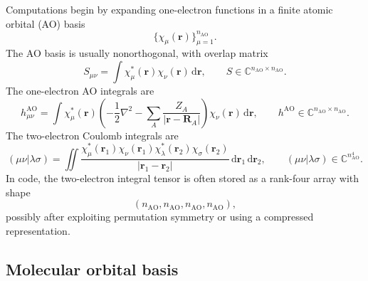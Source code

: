 \documentclass[11pt]{article}
\newcommand{\dd}{\,\mathrm{d}}
\begin{document}
Computations begin by expanding one-electron functions in a finite atomic orbital (AO) basis
\begin{equation}
    \{\chi_\mu(\mathbf{r})\}_{\mu=1}^{n_{\mathrm{AO}}}.
\end{equation}
The AO basis is usually nonorthogonal, with overlap matrix
\begin{equation}
    S_{\mu\nu}=\int \chi_\mu^*(\mathbf{r})\chi_\nu(\mathbf{r})\dd\mathbf{r},
    \qquad S\in\mathbb{C}^{n_{\mathrm{AO}}\times n_{\mathrm{AO}}}.
\end{equation}
The one-electron AO integrals are
\begin{equation}
    h^{\mathrm{AO}}_{\mu\nu}
    = \int \chi_\mu^*(\mathbf{r})
    \left(
        -\frac{1}{2}\nabla^2
        - \sum_A \frac{Z_A}{|\mathbf{r}-\mathbf{R}_A|}
    \right)
    \chi_\nu(\mathbf{r})\dd\mathbf{r},
    \qquad h^{\mathrm{AO}}\in\mathbb{C}^{n_{\mathrm{AO}}\times n_{\mathrm{AO}}}.
\end{equation}
The two-electron Coulomb integrals are
\begin{equation}
    (\mu\nu|\lambda\sigma)
    = \iint
    \frac{
        \chi_\mu^*(\mathbf{r}_1)\chi_\nu(\mathbf{r}_1)
        \chi_\lambda^*(\mathbf{r}_2)\chi_\sigma(\mathbf{r}_2)
    }
    {|\mathbf{r}_1-\mathbf{r}_2|}
    \dd\mathbf{r}_1\dd\mathbf{r}_2,
    \qquad (\mu\nu|\lambda\sigma)\in\mathbb{C}^{n_{\mathrm{AO}}^4}.
\end{equation}
In code, the two-electron integral tensor is often stored as a rank-four array with shape
\begin{equation}
    (n_{\mathrm{AO}}, n_{\mathrm{AO}}, n_{\mathrm{AO}}, n_{\mathrm{AO}}),
\end{equation}
possibly after exploiting permutation symmetry or using a compressed representation.

\subsection{Molecular orbital basis}
\end{document}
